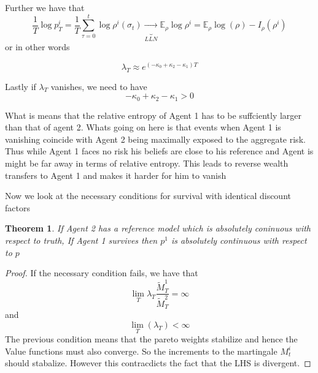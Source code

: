 \documentclass[12pt]{article}
\newtheorem{theorem}{Theorem}
\begin{document}
Further we have that
\[\frac{1}{T}\log {p^i_T} = \frac{1}{T}\sum^{t}_{\tau=0} \log \rho^i(\sigma_t) \underbrace{\to}_{LLN} \mathbb{E}_{\rho} \log \rho^i   =  \mathbb{E}_\rho\log(\rho) -I_{\rho}(\rho^i)\]
or in other words

\[\lambda_T\approx e^{(-\kappa_0+\kappa_2-\kappa_1)T}\]

Lastly if $\lambda_T$ vanishes, we need to have
\[-\kappa_0+\kappa_2-\kappa_1 >0 \]

What is means that the relative entropy of Agent 1 has to be suffciently larger than that of agent 2. Whats going on here is that events when Agent 1 is vanishing coincide with Agent 2 being maximally exposed to the aggregate risk. Thus while Agent 1 faces no risk his beliefs are close to his reference and Agent is might be far away in terms of relative entropy. This leads to reverse wealth transfers to Agent 1 and makes it harder for him to vanish

Now we look at the necessary conditions for survival with identical discount factors
\begin{theorem}
If Agent 2 has a reference model which is absolutely coninuous with respect to truth, If Agent 1 survives then $p^1$ is absolutely continuous with respect to $p$
\end{theorem}
\begin{proof}
If the necessary condition fails, we have that
\[\lim_T\lambda_T\frac{\tilde{M}^1_T}{\tilde{M}^2_T}=\infty\]
and 
\[\lim_T(\lambda_T)<\infty\]
The previous condition means that the pareto weights stabilize and hence the Value functions must also converge. So the increments to the martingale $M^i_t$ should stabalize. However this contracdicts the fact that the LHS is divergent.
\end{proof}
	
%
%
%
%
\end{document}
